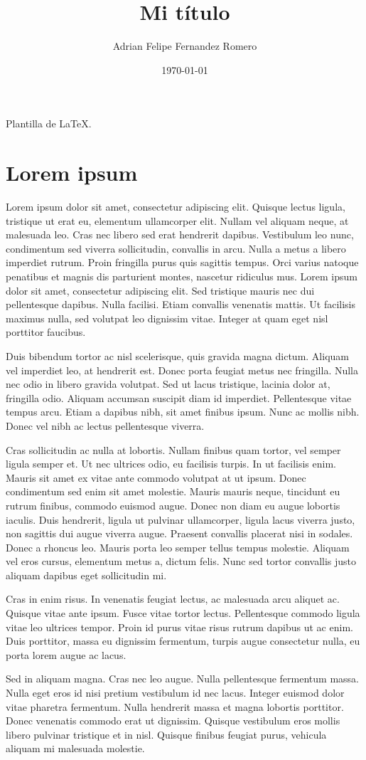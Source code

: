 \documentclass{article}
\author{Adrian Felipe Fernandez Romero}
\title{Mi título}
\date{\today}
\begin{document}
\maketitle

Plantilla de \LaTeX.

\section{Lorem ipsum}

Lorem ipsum dolor sit amet, consectetur adipiscing elit. Quisque lectus ligula,
tristique ut erat eu, elementum ullamcorper elit. Nullam vel aliquam neque, at
malesuada leo. Cras nec libero sed erat hendrerit dapibus. Vestibulum leo nunc,
condimentum sed viverra sollicitudin, convallis in arcu. Nulla a metus a libero
imperdiet rutrum. Proin fringilla purus quis sagittis tempus. Orci varius
natoque penatibus et magnis dis parturient montes, nascetur ridiculus mus. Lorem
ipsum dolor sit amet, consectetur adipiscing elit. Sed tristique mauris nec dui
pellentesque dapibus. Nulla facilisi. Etiam convallis venenatis mattis. Ut
facilisis maximus nulla, sed volutpat leo dignissim vitae. Integer at quam eget
nisl porttitor faucibus.

Duis bibendum tortor ac nisl scelerisque, quis gravida magna dictum. Aliquam vel
imperdiet leo, at hendrerit est. Donec porta feugiat metus nec fringilla. Nulla
nec odio in libero gravida volutpat. Sed ut lacus tristique, lacinia dolor at,
fringilla odio. Aliquam accumsan suscipit diam id imperdiet. Pellentesque vitae
tempus arcu. Etiam a dapibus nibh, sit amet finibus ipsum. Nunc ac mollis
nibh. Donec vel nibh ac lectus pellentesque viverra.

Cras sollicitudin ac nulla at lobortis. Nullam finibus quam tortor, vel semper
ligula semper et. Ut nec ultrices odio, eu facilisis turpis. In ut facilisis
enim. Mauris sit amet ex vitae ante commodo volutpat at ut ipsum. Donec
condimentum sed enim sit amet molestie. Mauris mauris neque, tincidunt eu rutrum
finibus, commodo euismod augue. Donec non diam eu augue lobortis iaculis. Duis
hendrerit, ligula ut pulvinar ullamcorper, ligula lacus viverra justo, non
sagittis dui augue viverra augue. Praesent convallis placerat nisi in
sodales. Donec a rhoncus leo. Mauris porta leo semper tellus tempus
molestie. Aliquam vel eros cursus, elementum metus a, dictum felis. Nunc sed
tortor convallis justo aliquam dapibus eget sollicitudin mi.

Cras in enim risus. In venenatis feugiat lectus, ac malesuada arcu aliquet
ac. Quisque vitae ante ipsum. Fusce vitae tortor lectus. Pellentesque commodo
ligula vitae leo ultrices tempor. Proin id purus vitae risus rutrum dapibus ut
ac enim. Duis porttitor, massa eu dignissim fermentum, turpis augue consectetur
nulla, eu porta lorem augue ac lacus.

Sed in aliquam magna. Cras nec leo augue. Nulla pellentesque fermentum
massa. Nulla eget eros id nisi pretium vestibulum id nec lacus. Integer euismod
dolor vitae pharetra fermentum. Nulla hendrerit massa et magna lobortis
porttitor. Donec venenatis commodo erat ut dignissim. Quisque vestibulum eros
mollis libero pulvinar tristique et in nisl. Quisque finibus feugiat purus,
vehicula aliquam mi malesuada molestie.
\end{document}
